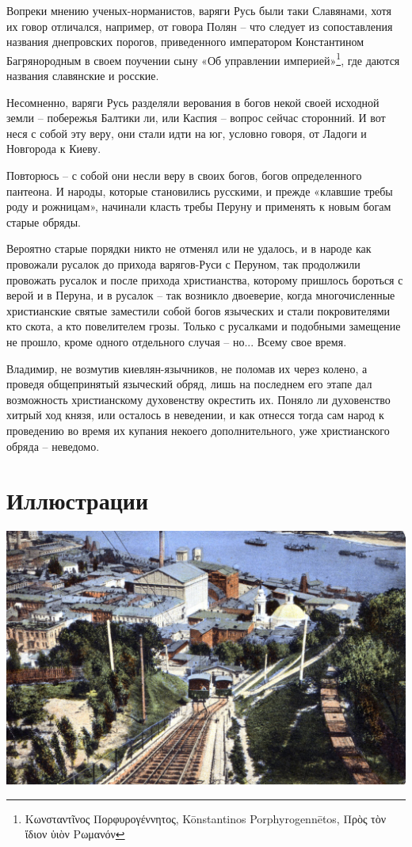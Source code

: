 \documentclass[a5paper,11pt,openany]{article}
\begin{document}
   Вопреки мнению ученых-норманистов, варяги Русь были таки Славянами, хотя их говор отличался, например, от говора Полян – что следует из сопоставления названия днепровских порогов, приведенного императором Константином Багрянородным в своем поучении сыну «Об управлении империей»\footnote{Κωνσταντῖνος Πορφυρογέννητος, Kōnstantinos Porphyrogennētos, Πρὸς τὸν ἴδιον ὑιὸν Ρωμανόν}, где даются названия славянские и росские.

    Несомненно, варяги Русь разделяли верования в богов некой своей исходной земли – побережья Балтики ли, или Каспия – вопрос сейчас сторонний. И вот неся с собой эту веру, они стали идти на юг, условно говоря, от Ладоги и Новгорода к Киеву.

   Повторюсь – с собой они несли веру в своих богов, богов определенного пантеона. И народы, которые становились русскими, и прежде «клавшие требы роду и рожницам», начинали класть требы Перуну и применять к новым богам старые обряды.

   Вероятно старые порядки никто не отменял или не удалось, и в народе как провожали русалок до прихода варягов-Руси с Перуном, так продолжили провожать русалок и после прихода христианства, которому пришлось бороться с верой и в Перуна, и в русалок – так возникло двоеверие, когда многочисленные христианские святые заместили собой богов языческих и стали покровителями кто скота, а кто повелителем грозы. Только с русалками и подобными замещение не прошло, кроме одного отдельного случая – но... Всему свое время.

   Владимир, не возмутив киевлян-язычников, не поломав их через колено, а проведя общепринятый языческий обряд, лишь на последнем его этапе дал возможность христианскому духовенству окрестить их. Поняло ли духовенство хитрый ход князя, или осталось в неведении, и как отнесся тогда сам народ к проведению во время их купания некоего дополнительного, уже христианского обряда – неведомо.

\newpage

\section{Иллюстрации}

\vspace*{\fill}

\begin{center}
\includegraphics[width=\linewidth]{s-mihpod.jpg}
\end{center}
\end{document}
